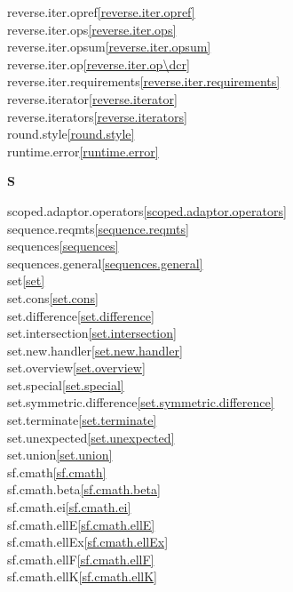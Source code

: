 \begin{multicols}{2}
reverse.iter.opref\quad\ref{reverse.iter.opref}\\
reverse.iter.ops\quad\ref{reverse.iter.ops}\\
reverse.iter.opsum\quad\ref{reverse.iter.opsum}\\
reverse.iter.op\dcr\quad\ref{reverse.iter.op\dcr}\\
reverse.iter.requirements\quad\ref{reverse.iter.requirements}\\
reverse.iterator\quad\ref{reverse.iterator}\\
reverse.iterators\quad\ref{reverse.iterators}\\
round.style\quad\ref{round.style}\\
runtime.error\quad\ref{runtime.error}\\
\par \textbf{S}\par
scoped.adaptor.operators\quad\ref{scoped.adaptor.operators}\\
sequence.reqmts\quad\ref{sequence.reqmts}\\
sequences\quad\ref{sequences}\\
sequences.general\quad\ref{sequences.general}\\
set\quad\ref{set}\\
set.cons\quad\ref{set.cons}\\
set.difference\quad\ref{set.difference}\\
set.intersection\quad\ref{set.intersection}\\
set.new.handler\quad\ref{set.new.handler}\\
set.overview\quad\ref{set.overview}\\
set.special\quad\ref{set.special}\\
set.symmetric.difference\quad\ref{set.symmetric.difference}\\
set.terminate\quad\ref{set.terminate}\\
set.unexpected\quad\ref{set.unexpected}\\
set.union\quad\ref{set.union}\\
sf.cmath\quad\ref{sf.cmath}\\
sf.cmath.beta\quad\ref{sf.cmath.beta}\\
sf.cmath.ei\quad\ref{sf.cmath.ei}\\
sf.cmath.ellE\quad\ref{sf.cmath.ellE}\\
sf.cmath.ellEx\quad\ref{sf.cmath.ellEx}\\
sf.cmath.ellF\quad\ref{sf.cmath.ellF}\\
sf.cmath.ellK\quad\ref{sf.cmath.ellK}\\

\end{multicols}
